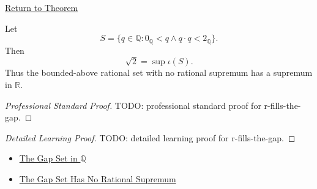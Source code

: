 \newpage
{}
\label{prf:r-fills-the-gap}

\begin{remark*}[Return]
\hyperref[cor:r-fills-the-gap]{Return to Theorem}
\end{remark*}

\begin{corollary*}
Let
\[
S=\{q\in\mathbb{Q}:0_{\mathbb{Q}}<q\land q\cdot q<2_{\mathbb{Q}}\}.
\]
Then
\[
\sqrt{2}=\sup \iota(S).
\]
Thus the bounded-above rational set with no rational supremum has a supremum
in $\mathbb{R}$.
\end{corollary*}

\begin{proof}[Professional Standard Proof]
\LRAProofBodyStart
TODO: professional standard proof for r-fills-the-gap.
\end{proof}

\begin{proof}[Detailed Learning Proof]
\LRAProofBodyStart
TODO: detailed learning proof for r-fills-the-gap.
\end{proof}

\begin{remark*}
\end{remark*}

\begin{dependencies}
\begin{itemize}
  \item \hyperref[def:gap-set-q]{The Gap Set in $\mathbb{Q}$}
  \item \hyperref[thm:gap-set-no-rational-supremum-q]{The Gap Set Has No Rational Supremum}
\end{itemize}
\end{dependencies}

\clearpage
